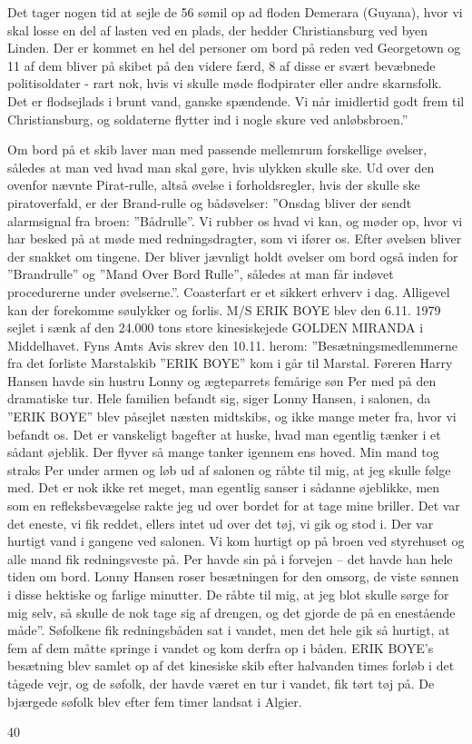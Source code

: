 Det tager nogen tid at sejle de 56 sømil op ad floden Demerara
(Guyana), hvor vi skal losse en del af lasten ved en plads, der hedder
Christiansburg ved byen Linden. Der er kommet en hel del personer om
bord på reden ved Georgetown og 11 af dem bliver på skibet på den videre
færd, 8 af disse er svært bevæbnede politisoldater - rart nok, hvis vi
skulle møde flodpirater eller andre skarnsfolk. Det er flodsejlads i
brunt vand, ganske spændende. Vi når imidlertid godt frem til
Christiansburg, og soldaterne flytter ind i nogle skure ved
anløbsbroen.'' 

Om bord på et skib laver man med passende mellemrum
forskellige øvelser, således at man ved hvad man skal gøre, hvis ulykken
skulle ske. Ud over den ovenfor nævnte Pirat-rulle, altså øvelse i
forholdsregler, hvis der skulle ske piratoverfald, er der Brand-rulle og
bådøvelser: ''Onsdag bliver der sendt alarmsignal fra broen:
''Bådrulle''. Vi rubber os hvad vi kan, og møder op, hvor vi har besked
på at møde med redningsdragter, som vi ifører os. Efter øvelsen bliver
der snakket om tingene. Der bliver jævnligt holdt øvelser om bord også
inden for ''Brandrulle'' og ''Mand Over Bord Rulle'', således at man får
indøvet procedurerne under øvelserne.''. Coasterfart er et sikkert
erhverv i dag. Alligevel kan der forekomme søulykker og forlis. M/S ERIK
BOYE blev den 6.11. 1979 sejlet i sænk af den 24.000 tons store
kinesiskejede GOLDEN MIRANDA i Middelhavet. Fyns Amts Avis skrev den
10.11. herom: ''Besætningsmedlemmerne fra det forliste Marstalskib
''ERIK BOYE'' kom i går til Marstal. Føreren Harry Hansen havde sin
hustru Lonny og ægteparrets femårige søn Per med på den dramatiske tur.
Hele familien befandt sig, siger Lonny Hansen, i salonen, da ''ERIK
BOYE'' blev påsejlet næsten midtskibs, og ikke mange meter fra, hvor vi
befandt os. Det er vanskeligt bagefter at huske, hvad man egentlig
tænker i et sådant øjeblik. Der flyver så mange tanker igennem ens
hoved. Min mand tog straks Per under armen og løb ud af salonen og råbte
til mig, at jeg skulle følge med. Det er nok ikke ret meget, man
egentlig sanser i sådanne øjeblikke, men som en refleksbevægelse rakte
jeg ud over bordet for at tage mine briller. Det var det eneste, vi fik
reddet, ellers intet ud over det tøj, vi gik og stod i. Der var hurtigt
vand i gangene ved salonen. Vi kom hurtigt op på broen ved styrehuset og
alle mand fik redningsveste på. Per havde sin på i forvejen -- det havde
han hele tiden om bord. Lonny Hansen roser besætningen for den omsorg,
de viste sønnen i disse hektiske og farlige minutter. De råbte til mig,
at jeg blot skulle sørge for mig selv, så skulle de nok tage sig af
drengen, og det gjorde de på en enestående måde''. Søfolkene fik
redningsbåden sat i vandet, men det hele gik så hurtigt, at fem af dem
måtte springe i vandet og kom derfra op i båden. ERIK BOYE's besætning
blev samlet op af det kinesiske skib efter halvanden times forløb i det
tågede vejr, og de søfolk, der havde været en tur i vandet, fik tørt tøj
på. De bjærgede søfolk blev efter fem timer landsat i Algier.

40
